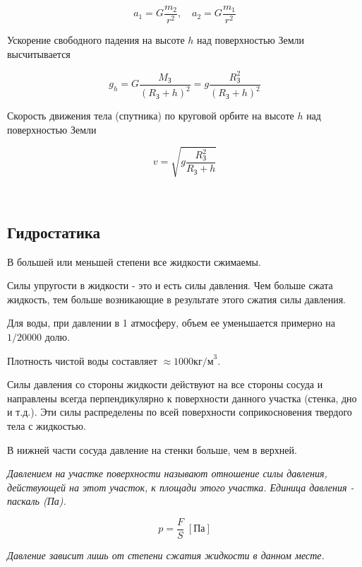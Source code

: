 \documentclass[a4paper,12pt]{article}
\begin{document}
		\begin{equation*}
			a_1 = G \frac{m_2}{r^2}, \quad a_2 = G \frac{m_1}{r^2}
		\end{equation*}


		Ускорение свободного падения на высоте $h$ над поверхностью Земли высчитывается

		\begin{equation}
			g_h = G \frac{M_\text{З}}{(R_\text{З} + h)^2} = g \frac{R_\text{З}^2}{(R_\text{З} + h)^2}
		\end{equation}

		Скорость движения тела (спутника) по круговой орбите на высоте $h$ над поверхностью Земли

		\begin{equation}
			v = \sqrt{g \frac{R^2_\text{З}}{R_\text{З} + h}}
		\end{equation}

		\


		\subsection*{Гидростатика}

		В большей или меньшей степени все жидкости сжимаемы.

		Силы упругости в жидкости - это и есть силы давления. Чем больше сжата жидкость,
		тем больше возникающие в результате этого сжатия силы давления.

		Для воды, при давлении в 1 атмосферу, объем ее уменьшается примерно на 
		$1/20000$ долю.

		Плотность чистой воды составляет $\approx 1000 \text{кг/м}^3$.

		Силы давления со стороны жидкости действуют на все стороны сосуда и направлены 
		всегда перпендикулярно к поверхности данного участка (стенка, дно и т.д.).
		Эти силы распределены по всей поверхности соприкосновения твердого тела с
		жидкостью.

		В нижней части сосуда давление на стенки больше, чем в верхней.

		\textit{Давлением на участке поверхности называют отношение силы давления, действующей
		на этот участок, к площади этого участка. Единица давления - паскаль (Па).}

		\begin{equation}
			p = \frac{F}{S} \; [\text{Па}]
		\end{equation}

		\textit{Давление зависит лишь от степени сжатия жидкости в данном месте.}
\end{document}
